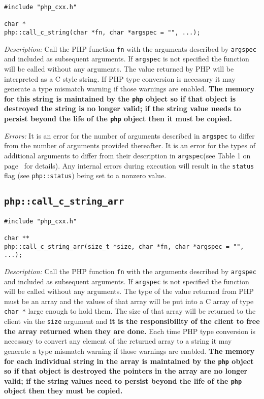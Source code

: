 \documentclass[11pt,titlepage]{article}
\begin{document}
\begin{verbatim}
#include "php_cxx.h"

char *
php::call_c_string(char *fn, char *argspec = "", ...);
\end{verbatim}

\emph{Description:} Call the PHP function \verb|fn| with the arguments described by \verb|argspec| and included as subsequent arguments. If \verb|argspec| is not specified the function will be called without any arguments. The value returned by PHP will be interpreted as a C style string. If PHP type conversion is necessary it may generate a type mismatch warning if those warnings are enabled. \textbf{The memory for this string is maintained by the \texttt{php} object so if that object is destroyed the string is no longer valid; if the string value needs to persist beyond the life of the \texttt{php} object then it must be copied.}

\emph{Errors:} It is an error for the number of arguments described in \verb|argspec| to differ from the number of arguments provided thereafter. It is an error for the types of additional arguments to differ from their description in \verb|argspec|(see Table 1 on page~\pageref{Table1} for details). Any internal errors during execution will result in the \verb|status| flag (see \verb|php::status|) being set to a nonzero value.

\subsection{\texttt{php::call\_c\_string\_arr}}

\begin{verbatim}
#include "php_cxx.h"

char **
php::call_c_string_arr(size_t *size, char *fn, char *argspec = "", ...);
\end{verbatim}

\emph{Description:} Call the PHP function \verb|fn| with the arguments described by \verb|argspec| and included as subsequent arguments. If \verb|argspec| is not specified the function will be called without any arguments. The type of the value returned from PHP must be an array and the values of that array will be put into a C array of type \verb|char *| large enough to hold them. The size of that array will be returned to the client via the \verb|size| argument and \textbf{it is the responsibility of the client to free the array returned when they are done.} Each time PHP type conversion is necessary to convert any element of the returned array to a string it may generate a type mismatch warning if those warnings are enabled.  \textbf{The memory for each individual string in the array is maintained by the \texttt{php} object so if that object is destroyed the pointers in the array are no longer valid; if the string values need to persist beyond the life of the \texttt{php} object then they must be copied.}
\end{document}
